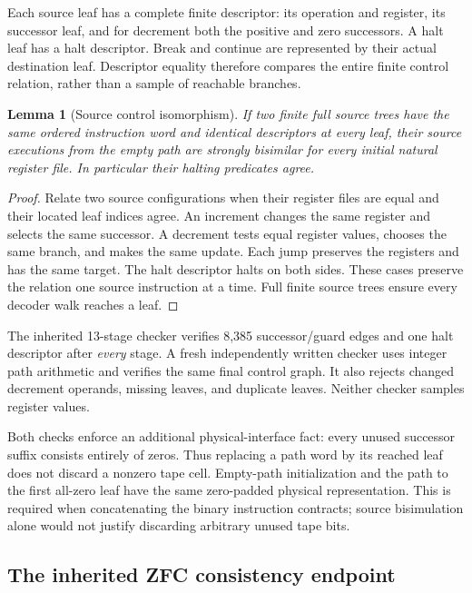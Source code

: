 \documentclass[11pt,letterpaper]{article}
\newtheorem{lemma}[theorem]{Lemma}
\theoremstyle{definition}\newtheorem{definition}[theorem]{Definition}
\begin{document}
Each source leaf has a complete finite descriptor: its operation and
register, its successor leaf, and for decrement both the positive and
zero successors.  A halt leaf has a halt descriptor.  Break and continue
are represented by their actual destination leaf.  Descriptor equality
therefore compares the entire finite control relation, rather than a
sample of reachable branches.

\begin{lemma}[Source control isomorphism]\label{lem:source}
If two finite full source trees have the same ordered instruction word
and identical descriptors at every leaf, their source executions from
the empty path are strongly bisimilar for every initial natural register
file.  In particular their halting predicates agree.
\end{lemma}

\begin{proof}
Relate two source configurations when their register files are equal and
their located leaf indices agree.  An increment changes the same register
and selects the same successor.  A decrement tests equal register values,
chooses the same branch, and makes the same update.  Each jump preserves
the registers and has the same target.  The halt descriptor halts on both
sides.  These cases preserve the relation one source instruction at a
time.  Full finite source trees ensure every decoder walk reaches a leaf.
\end{proof}

The inherited 13-stage checker verifies 8,385 successor/guard edges and
one halt descriptor after \emph{every} stage.  A fresh independently
written checker uses integer path arithmetic and verifies the same final
control graph.  It also rejects changed decrement operands, missing
leaves, and duplicate leaves.  Neither checker samples register values.

Both checks enforce an additional physical-interface fact: every unused
successor suffix consists entirely of zeros.  Thus replacing a path word
by its reached leaf does not discard a nonzero tape cell.  Empty-path
initialization and the path to the first all-zero leaf have the same
zero-padded physical representation.  This is required when concatenating
the binary instruction contracts; source bisimulation alone would not
justify discarding arbitrary unused tape bits.

\subsection{The inherited ZFC consistency endpoint}
\end{document}
